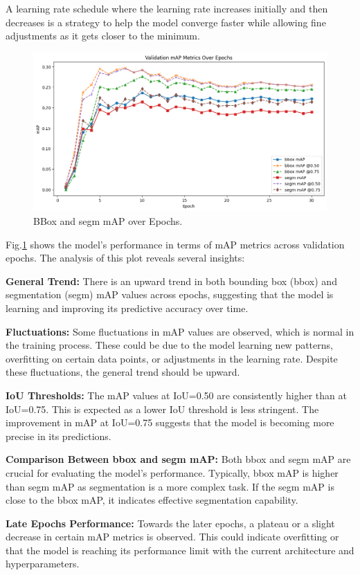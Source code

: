 A learning rate schedule where the learning rate increases initially and then decreases is a strategy to help the model converge faster while allowing fine adjustments as it gets closer to the minimum.

\begin{figure}[H]
    \centering
    \includegraphics[width=.9\textwidth]{Pictures/maskrcnn/mAP_30.png}
    \caption{BBox and segm mAP over Epochs.}
    \label{fig:mAP}
\end{figure}
Fig.\ref{fig:mAP} shows the model's performance in terms of mAP metrics across validation epochs. The analysis of this plot reveals several insights:

\textbf{General Trend:} There is an upward trend in both bounding box (bbox) and segmentation (segm) mAP values across epochs, suggesting that the model is learning and improving its predictive accuracy over time.

\textbf{Fluctuations:} Some fluctuations in mAP values are observed, which is normal in the training process. These could be due to the model learning new patterns, overfitting on certain data points, or adjustments in the learning rate. Despite these fluctuations, the general trend should be upward.

\textbf{IoU Thresholds:} The mAP values at IoU=0.50 are consistently higher than at IoU=0.75. This is expected as a lower IoU threshold is less stringent. The improvement in mAP at IoU=0.75 suggests that the model is becoming more precise in its predictions.

\textbf{Comparison Between bbox and segm mAP:} Both bbox and segm mAP are crucial for evaluating the model's performance. Typically, bbox mAP is higher than segm mAP as segmentation is a more complex task. If the segm mAP is close to the bbox mAP, it indicates effective segmentation capability.

\textbf{Late Epochs Performance:} Towards the later epochs, a plateau or a slight decrease in certain mAP metrics is observed. This could indicate overfitting or that the model is reaching its performance limit with the current architecture and hyperparameters.

